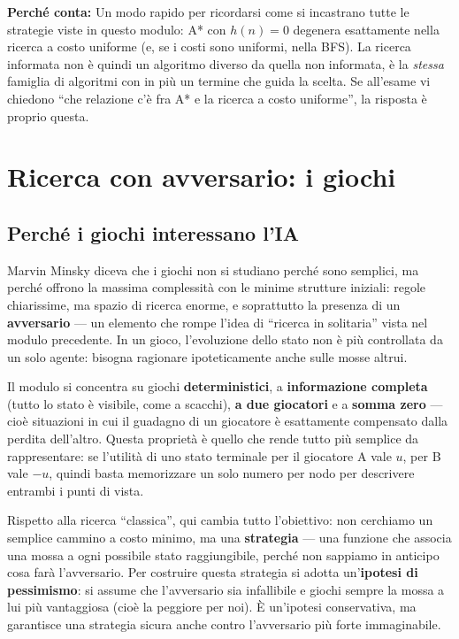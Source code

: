 \documentclass[11pt,a4paper]{article}
\newcommand{\perche}[1]{\begin{nota}\textbf{Perché conta:} #1\end{nota}}
\begin{document}
\perche{Un modo rapido per ricordarsi come si incastrano tutte le strategie viste in questo modulo: A* con $h(n)=0$ degenera esattamente nella ricerca a costo uniforme (e, se i costi sono uniformi, nella BFS). La ricerca informata non è quindi un algoritmo diverso da quella non informata, è la \emph{stessa} famiglia di algoritmi con in più un termine che guida la scelta. Se all'esame vi chiedono ``che relazione c'è fra A* e la ricerca a costo uniforme'', la risposta è proprio questa.}

\newpage
\section{Ricerca con avversario: i giochi}

\subsection{Perché i giochi interessano l'IA}

Marvin Minsky diceva che i giochi non si studiano perché sono semplici, ma perché offrono la massima complessità con le minime strutture iniziali: regole chiarissime, ma spazio di ricerca enorme, e soprattutto la presenza di un \textbf{avversario} --- un elemento che rompe l'idea di ``ricerca in solitaria'' vista nel modulo precedente. In un gioco, l'evoluzione dello stato non è più controllata da un solo agente: bisogna ragionare ipoteticamente anche sulle mosse altrui.

Il modulo si concentra su giochi \textbf{deterministici}, a \textbf{informazione completa} (tutto lo stato è visibile, come a scacchi), \textbf{a due giocatori} e a \textbf{somma zero} --- cioè situazioni in cui il guadagno di un giocatore è esattamente compensato dalla perdita dell'altro. Questa proprietà è quello che rende tutto più semplice da rappresentare: se l'utilità di uno stato terminale per il giocatore A vale $u$, per B vale $-u$, quindi basta memorizzare un solo numero per nodo per descrivere entrambi i punti di vista.

Rispetto alla ricerca ``classica'', qui cambia tutto l'obiettivo: non cerchiamo un semplice cammino a costo minimo, ma una \textbf{strategia} --- una funzione che associa una mossa a ogni possibile stato raggiungibile, perché non sappiamo in anticipo cosa farà l'avversario. Per costruire questa strategia si adotta un'\textbf{ipotesi di pessimismo}: si assume che l'avversario sia infallibile e giochi sempre la mossa a lui più vantaggiosa (cioè la peggiore per noi). È un'ipotesi conservativa, ma garantisce una strategia sicura anche contro l'avversario più forte immaginabile.
\end{document}
